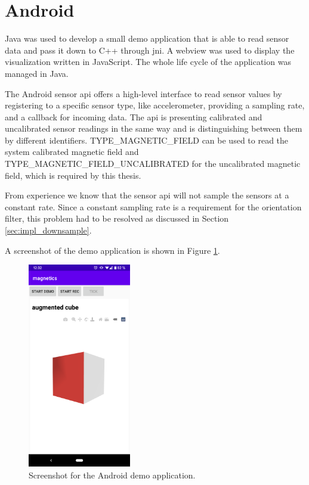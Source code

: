 \section{Android}

Java was used to develop a small demo application that is able to read sensor data and pass it down to C++ through \gls{jni}. A webview was used to display the visualization written in JavaScript. The whole life cycle of the application was managed in Java.

The Android sensor \gls{api} offers a high-level interface to read sensor values by registering to a specific sensor type, like accelerometer, providing a sampling rate, and a callback for incoming data. The \gls{api} is presenting calibrated and uncalibrated sensor readings in the same way and is distinguishing between them by different identifiers. \textsc{TYPE\_MAGNETIC\_FIELD} can be used to read the system calibrated magnetic field and \textsc{TYPE\_MAGNETIC\_FIELD\_UNCALIBRATED} for the uncalibrated magnetic field, which is required by this thesis.\cite{android_sdk_sensormanager}

From experience we know that the sensor \gls{api} will not sample the sensors at a constant rate. Since a constant sampling rate is a requirement for the orientation filter, this problem had to be resolved as discussed in Section \ref{sec:impl_downsample}.

A screenshot of the demo application is shown in Figure \ref{fig:app}.

\begin{figure}[hbt!]
    \centering
    \includegraphics[width=0.4\textwidth]{figures/app.png}
    \caption{Screenshot for the Android demo application.}
    \label{fig:app}
\end{figure}

